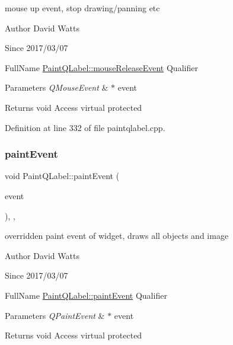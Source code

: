 mouse up event, stop drawing/panning etc

\begin{DoxyAuthor}{Author}
David Watts 
\end{DoxyAuthor}
\begin{DoxySince}{Since}
2017/03/07
\end{DoxySince}
Full\+Name \hyperlink{class_paint_q_label_a16f35714b89231d55c733ef94f583ff4}{Paint\+Q\+Label\+::mouse\+Release\+Event} Qualifier 
\begin{DoxyParams}{Parameters}
{\em Q\+Mouse\+Event} & $\ast$ event \\
\hline
\end{DoxyParams}
\begin{DoxyReturn}{Returns}
void Access virtual protected 
\end{DoxyReturn}


Definition at line 332 of file paintqlabel.\+cpp.

\mbox{\label{class_paint_q_label_adc08981924e300cd568881da8d321083}} 
\subsubsection{\texorpdfstring{paint\+Event}{paintEvent}}
{\footnotesize\ttfamily void Paint\+Q\+Label\+::paint\+Event (\begin{DoxyParamCaption}\item[{Q\+Paint\+Event $\ast$}]{event }\end{DoxyParamCaption})\hspace{0.3cm}{\ttfamily [protected]}, {\ttfamily [virtual]}, {\ttfamily [slot]}}

overridden paint event of widget, draws all objects and image

\begin{DoxyAuthor}{Author}
David Watts 
\end{DoxyAuthor}
\begin{DoxySince}{Since}
2017/03/07
\end{DoxySince}
Full\+Name \hyperlink{class_paint_q_label_adc08981924e300cd568881da8d321083}{Paint\+Q\+Label\+::paint\+Event} Qualifier 
\begin{DoxyParams}{Parameters}
{\em Q\+Paint\+Event} & $\ast$ event \\
\hline
\end{DoxyParams}
\begin{DoxyReturn}{Returns}
void Access virtual protected 
\end{DoxyReturn}


